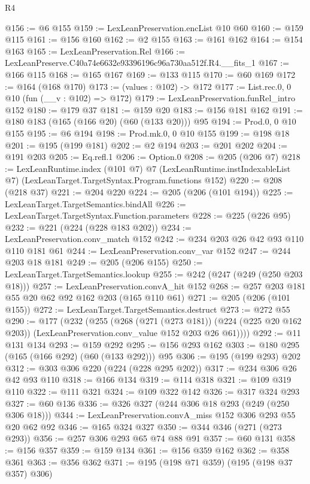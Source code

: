 \begin{lexlean}{R4}
\begin{coremodule}
@156 := @6 @155
@159 := LexLeanPreservation.encList @10 @60
@160 := @159 @115
@161 := @156 @160
@162 := @2 @155
@163 := @161 @162
@164 := @154 @163
@165 := LexLeanPreservation.Rel
@166 := LexLeanPreserve.C40a74e6632e93396196c96a730aa512f.R4.__fits_1
@167 := @166 @115
@168 := @165 @167
@169 := @133 @115
@170 := @60 @169
@172 := @164 (@168 @170)
@173 := (values : @102) -> @172
@177 := List.rec.{0, 0} @10 (fun (__v : @102) => @172)
@179 := LexLeanPreservation.funRel_intro @152
@180 := @179 @37
@181 := @159 @20
@183 := @156 @181 @162
@191 := @180 @183 (@165 (@166 @20) (@60 (@133 @20))) @95
@194 := Prod.{0, 0} @10 @155
@195 := @6 @194
@198 := Prod.mk.{0, 0} @10 @155
@199 := @198 @18
@201 := @195 (@199 @181)
@202 := @2 @194
@203 := @201 @202
@204 := @191 @203
@205 := Eq.refl.{1}
@206 := Option.{0}
@208 := @205 (@206 @7)
@218 := LexLeanRuntime.index
    (@101 @7)
    @7
    (LexLeanRuntime.instIndexableList @7)
    (LexLeanTarget.TargetSyntax.Program.functions @152)
@220 := @208 (@218 @37)
@221 := @204 @220
@224 := @205 (@206 (@101 @194))
@225 := LexLeanTarget.TargetSemantics.bindAll
@226 := LexLeanTarget.TargetSyntax.Function.parameters
@228 := @225 (@226 @95)
@232 := @221 (@224 (@228 @183 @202))
@234 := LexLeanPreservation.conv_match @152
@242 := @234 @203 @26 @42 @93 @110 @110 @181 @61
@244 := LexLeanPreservation.conv_var @152
@247 := @244 @203 @18 @181
@249 := @205 (@206 @155)
@250 := LexLeanTarget.TargetSemantics.lookup
@255 := @242 (@247 (@249 (@250 @203 @18)))
@257 := LexLeanPreservation.convA_hit @152
@268 := @257 @203 @181 @55 @20 @62 @92 @162 @203 (@165 @110 @61)
@271 := @205 (@206 (@101 @155))
@272 := LexLeanTarget.TargetSemantics.destruct
@273 := @272 @55
@290 := @177
    (@232
      (@255
        (@268
          (@271 (@273 @181))
          (@224 (@225 @20 @162 @203))
          (LexLeanPreservation.conv_value @152 @203 @26 @61))))
@292 := @11 @131 @134
@293 := @159 @292
@295 := @156 @293 @162
@303 := @180 @295 (@165 (@166 @292) (@60 (@133 @292))) @95
@306 := @195 (@199 @293) @202
@312 := @303 @306 @220 (@224 (@228 @295 @202))
@317 := @234 @306 @26 @42 @93 @110
@318 := @166 @134
@319 := @114 @318
@321 := @109 @319 @110
@322 := @111 @321
@324 := @109 @322 @142
@326 := @317 @324 @293
@327 := @60 @136
@336 := @326 @327 (@244 @306 @18 @293 (@249 (@250 @306 @18)))
@344 := LexLeanPreservation.convA_miss @152 @306 @293 @55 @20 @62 @92
@346 := @165 @324 @327
@350 := @344 @346 (@271 (@273 @293))
@356 := @257 @306 @293 @65 @74 @88 @91
@357 := @60 @131
@358 := @156 @357
@359 := @159 @134
@361 := @156 @359 @162
@362 := @358 @361
@363 := @356 @362
@371 := @195 (@198 @71 @359) (@195 (@198 @37 @357) @306)

\end{coremodule}
\end{lexlean}
